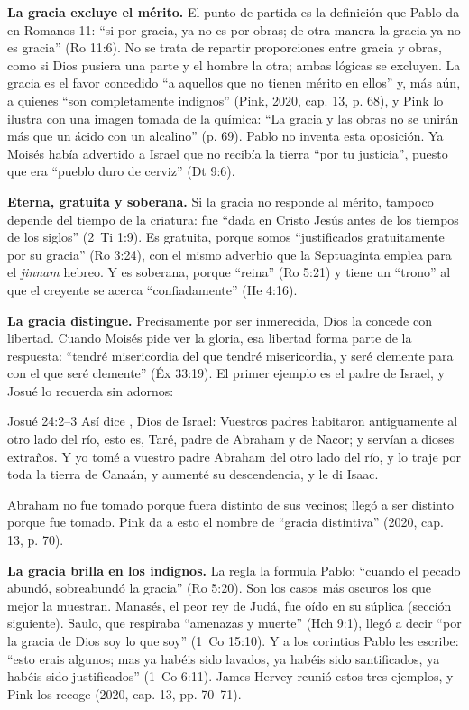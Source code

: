 \textbf{La gracia excluye el mérito.} El punto de partida es la definición que Pablo da en Romanos 11: ``si por gracia, ya no es por obras; de otra manera la gracia ya no es gracia'' (Ro 11:6). No se trata de repartir proporciones entre gracia y obras, como si Dios pusiera una parte y el hombre la otra; ambas lógicas se excluyen. La gracia es el favor concedido ``a aquellos que no tienen mérito en ellos'' y, más aún, a quienes ``son completamente indignos'' (Pink, 2020, cap. 13, p. 68), y Pink lo ilustra con una imagen tomada de la química: ``La gracia y las obras no se unirán más que un ácido con un alcalino'' (p. 69). Pablo no inventa esta oposición. Ya Moisés había advertido a Israel que no recibía la tierra ``por tu justicia'', puesto que era ``pueblo duro de cerviz'' (Dt 9:6).

\textbf{Eterna, gratuita y soberana.} Si la gracia no responde al mérito, tampoco depende del tiempo de la criatura: fue ``dada en Cristo Jesús antes de los tiempos de los siglos'' (2~Ti 1:9). Es gratuita, porque somos ``justificados gratuitamente por su gracia'' (Ro 3:24), con el mismo adverbio que la Septuaginta emplea para el \emph{jinnam} hebreo. Y es soberana, porque ``reina'' (Ro 5:21) y tiene un ``trono'' al que el creyente se acerca ``confiadamente'' (He 4:16).

\textbf{La gracia distingue.} Precisamente por ser inmerecida, Dios la concede con libertad. Cuando Moisés pide ver la gloria, esa libertad forma parte de la respuesta: ``tendré misericordia del que tendré misericordia, y seré clemente para con el que seré clemente'' (Éx 33:19). El primer ejemplo es el padre de Israel, y Josué lo recuerda sin adornos:

\begin{verso}{Josué 24:2–3}
Así dice \SENOR, Dios de Israel: Vuestros padres habitaron antiguamente al otro lado del río, esto es, Taré, padre de Abraham y de Nacor; y servían a dioses extraños. Y yo tomé a vuestro padre Abraham del otro lado del río, y lo traje por toda la tierra de Canaán, y aumenté su descendencia, y le di Isaac.
\end{verso}

Abraham no fue tomado porque fuera distinto de sus vecinos; llegó a ser distinto porque fue tomado. Pink da a esto el nombre de ``gracia distintiva'' (2020, cap. 13, p. 70).

\textbf{La gracia brilla en los indignos.} La regla la formula Pablo: ``cuando el pecado abundó, sobreabundó la gracia'' (Ro 5:20). Son los casos más oscuros los que mejor la muestran. Manasés, el peor rey de Judá, fue oído en su súplica (sección siguiente). Saulo, que respiraba ``amenazas y muerte'' (Hch 9:1), llegó a decir ``por la gracia de Dios soy lo que soy'' (1~Co 15:10). Y a los corintios Pablo les escribe: ``esto erais algunos; mas ya habéis sido lavados, ya habéis sido santificados, ya habéis sido justificados'' (1~Co 6:11). James Hervey reunió estos tres ejemplos, y Pink los recoge (2020, cap. 13, pp. 70--71).

